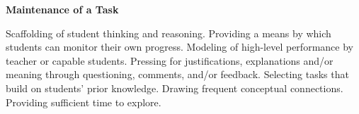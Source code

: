 \documentclass[11pt]{article}
\theoremstyle{theorem}\newtheorem*{task}{Task}
\theoremstyle{theorem}\newtheorem*{example}{Example}
\theoremstyle{definition}\newtheorem*{solution}{Solution}
\theoremstyle{theorem}\newtheorem*{prompt}{Prompt}
\begin{document}
\noindent \textbf{Maintenance of a Task}

Scaffolding of student thinking and reasoning. Providing a means by which students can monitor their own progress. Modeling of high-level performance by teacher or capable students. Pressing for justifications, explanations and/or meaning through questioning, comments, and/or feedback. Selecting tasks that build on students' prior knowledge. Drawing frequent conceptual connections. Providing sufficient time to explore.
\end{document}
